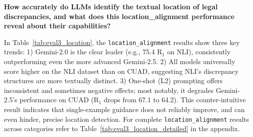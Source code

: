 \documentclass[11pt]{article}
\begin{document}
\noindent\textbf{How accurately do LLMs identify the textual location of legal discrepancies, and what does this location\_alignment performance reveal about their capabilities?}

\noindent In Table~\ref{tab:eval3_location}, the \texttt{location\_alignment} results show three key trends: 1) Gemini-2.0 is the clear leader (e.g., 75.4 R$_1$ on NLI), consistently outperforming even the more advanced Gemini-2.5. 2) All models universally score higher on the NLI dataset than on CUAD, suggesting NLI's discrepancy structures are more textually distinct. 3) One-shot (L2) prompting offers inconsistent and sometimes negative effects; most notably, it degrades Gemini-2.5's performance on CUAD (R$_1$ drops from 67.1 to 64.2). This counter-intuitive result indicates that single-example guidance does not reliably improve, and can even hinder, precise location detection. For complete \texttt{location\_alignment} results across categories refer to Table~\ref{tab:eval3_location_detailed} in the appendix.
\end{document}
